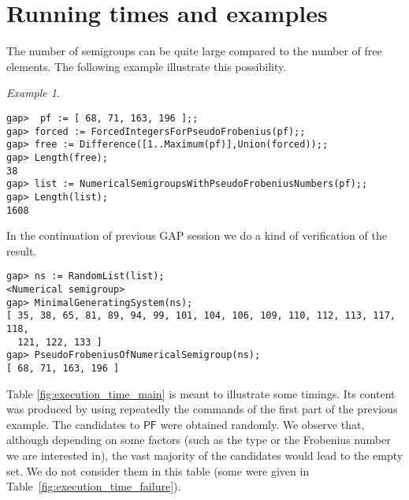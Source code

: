 \documentclass[11pt]{amsart}
\theoremstyle{remark}
\newtheorem{example}[theorem]{Example}
\begin{document}
\section{Running times and examples}
\label{sec:running_times}
The number of semigroups can be quite large compared to the number of free elements. The following example illustrate this possibility.
\begin{example}\label{example:free_give_rise to_many}
\begin{verbatim}
gap>  pf := [ 68, 71, 163, 196 ];;
gap> forced := ForcedIntegersForPseudoFrobenius(pf);;
gap> free := Difference([1..Maximum(pf)],Union(forced));;
gap> Length(free);
38
gap> list := NumericalSemigroupsWithPseudoFrobeniusNumbers(pf);;
gap> Length(list);
1608
\end{verbatim}
In the continuation of previous \textsf{GAP} session we do a kind of verification of the result.
\begin{verbatim}
gap> ns := RandomList(list);
<Numerical semigroup>
gap> MinimalGeneratingSystem(ns);
[ 35, 38, 65, 81, 89, 94, 99, 101, 104, 106, 109, 110, 112, 113, 117, 118, 
  121, 122, 133 ]
gap> PseudoFrobeniusOfNumericalSemigroup(ns);
[ 68, 71, 163, 196 ]
\end{verbatim}
\end{example}
Table \ref{fig:execution_time_main} is meant to illustrate some timings. Its content was produced by using repeatedly the commands of the first part of the previous example. The candidates to ${\ensuremath{\mathsf{PF}}}$ were obtained randomly.
We observe that, although depending on some factors (such as the type or the Frobenius number we are interested in), the vast majority of the candidates would lead to the empty set. We do not consider them in this table (some were given in Table~\ref{fig:execution_time_failure}). 
 
\end{document}
